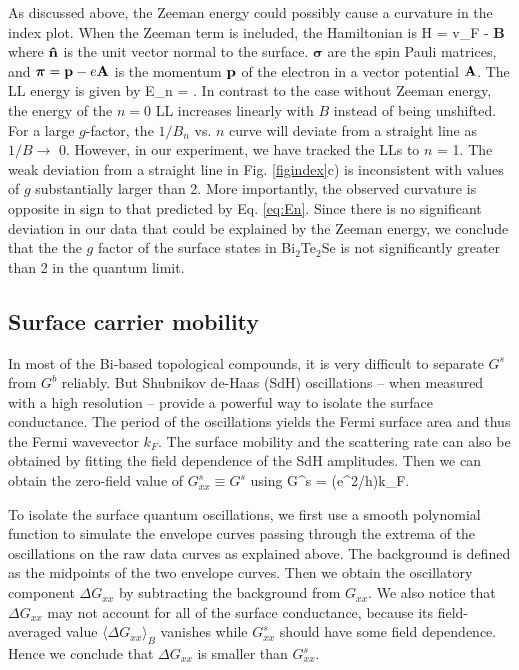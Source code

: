 As discussed above, the Zeeman energy could possibly cause a curvature in the index plot. When the Zeeman term is included, the Hamiltonian is
\be
H = v_F {\bf {}}\cdot \bm{\sigma\times\pi}-  {\bf B}\cdot\bm{\sigma}
\label{eq:H}
\ee
where $\bf \hat{n}$ is the unit vector normal to the surface. $\bm\sigma$ are the spin Pauli matrices, and $\bm{\pi} = {\bf p}-e{\bf A}$ is the momentum $\bf p$ of the
electron in a vector potential ${\bf A}$. The LL energy is given by 
\be 
E_n = \pm{}.
\label{eq:En}
\ee
In contrast to the case without Zeeman energy, the energy of the $n=0$ LL increases linearly with $B$ instead of being unshifted.
For a large $g$-factor, the $1/B_n$ vs. $n$ curve will deviate from a straight line as $1/B\to$ 0. However, in our experiment, we have
tracked the LLs to $n$ = 1. The weak deviation from a straight line in Fig. \ref{figindex}c) 
is inconsistent with values of $g$ substantially larger than 2. More importantly, the
observed curvature is opposite in sign to that predicted by Eq. \ref{eq:En}. Since there is no significant deviation in our data that could be explained by the Zeeman energy, we conclude that the 
the $g$ factor of the surface states in Bi$_2$Te$_2$Se is not significantly greater than 2 in the quantum limit. 

\subsection{Surface carrier mobility}\label{fit}

In most of the Bi-based topological compounds, it is very difficult to separate $G^s$ from $G^b$ reliably.  
But Shubnikov de-Haas (SdH) oscillations -- when measured with a high resolution -- 
provide a powerful way to isolate the surface conductance.
The period of the oscillations yields the Fermi surface area and thus the Fermi wavevector $k_F$. The surface mobility and the scattering rate can also be obtained by fitting the field dependence of the SdH amplitudes.
Then we can obtain the zero-field value of $G^s_{xx}\equiv G^s$ using
\be
G^s = (e^2/h)k_F\ell.
\label{eq:Gs}
\ee

To isolate the surface quantum oscillations, we first use a smooth polynomial function to simulate the envelope curves
passing through the extrema of the oscillations on the raw data curves as explained above. The background is defined as the midpoints of the two envelope curves. Then we obtain the oscillatory component $\Delta G_{xx}$ by subtracting the background from $G_{xx}$. We also notice that  $\Delta G_{xx}$ may not account for all of the
surface conductance, because its field-averaged value $\langle\Delta G_{xx}\rangle_B$
vanishes while $G^s_{xx}$ should have some field dependence. Hence we conclude that $\Delta G_{xx}$ is smaller than $G^s_{xx}$.



